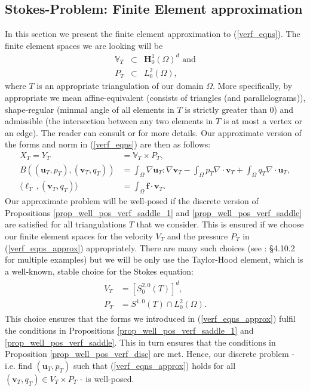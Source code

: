 \documentclass[12pt,a4paper]{article}
\theoremstyle{definition}
\begin{document}
\subsection{Stokes-Problem: Finite Element approximation}
In this section we present the finite element approximation to (\ref{verf_eqns}).  The finite element spaces we are looking will be
\begin{eqnarray}
	\mathbb{V}_T&\subset&\textbf{H}^1_0\left(\Omega\right)^d \text{ and}\nonumber\\
	P_T&\subset& L^2_0\left(\Omega\right),\nonumber
\end{eqnarray}
where $T$ is an appropriate triangulation of our domain $\Omega$.  More specifically, by appropriate we mean affine-equivalent (consists of triangles (and parallelograms)), shape-regular (minmal angle of all elements in $T$ is strictly greater than $0$)  and admissible (the intersection between any two elements in $T$ is at most a vertex or an edge).  The reader can consult \cite{verfurth2013posteriori} or \cite{brenner2007mathematical} for more details.
Our approximate version of the forms and norm in (\ref{verf_eqns}) are then as follows:
\begin{equation}\label{verf_eqns_approx}
\begin{aligned}
X_T=Y_T&=\mathbb{V}_T\times P_T,\\
B\left(\left(\textbf{u}_T,p_T\right),\left(\textbf{v}_T,q_T\right)\right)&=\int_{\Omega}\nabla \textbf{u}_T : \nabla \textbf{v}_T - \int_{\Omega} p_T \nabla\cdot\textbf{v}_T + \int_{\Omega} q_T \nabla\cdot\textbf{u}_T,\\
\langle \ell_T\,,\left(\textbf{v}_T,q_T\right) \rangle &= \int_{\Omega}\textbf{f}\cdot \textbf{v}_T.
\end{aligned}
\end{equation}
Our approximate problem will be well-posed if the discrete version of Propositions \ref{prop_well_pos_verf_saddle_1} and \ref{prop_well_pos_verf_saddle} are satisfied for all triangulations $T$ that we consider.  This is ensured if we choose our finite element spaces for the velocity $V_T$ and the pressure $P_T$ in (\ref{verf_eqns_approx}) appropriately.
There are many such choices (see \cite{verfurth2013posteriori}: \S 4.10.2 for multiple examples) but we will be only use the Taylor-Hood element, which is a well-known, stable choice for the Stokes equation:
\begin{eqnarray}
\begin{aligned}
V_T&=\left[S^{2,0}_0\left(T\right)\right]^d,\\
P_T&=S^{1,0}\left(T\right)\cap L^2_0\left(\Omega\right).
\end{aligned}
\end{eqnarray}
This choice ensures that the forms we introduced in (\ref{verf_eqns_approx}) fulfil the conditions in Propositions \ref{prop_well_pos_verf_saddle_1} and \ref{prop_well_pos_verf_saddle}.  This in turn ensures that the conditions in Proposition \ref{prop_well_pos_verf_disc} are met.  Hence, our discrete problem - i.e. find $\left(\textbf{u}_T, p_T\right)$ such that (\ref{verf_eqns_approx}) holds for all $\left(\textbf{v}_T,q_T\right)\in V_T\times P_T$ - is well-posed.
\end{document}
